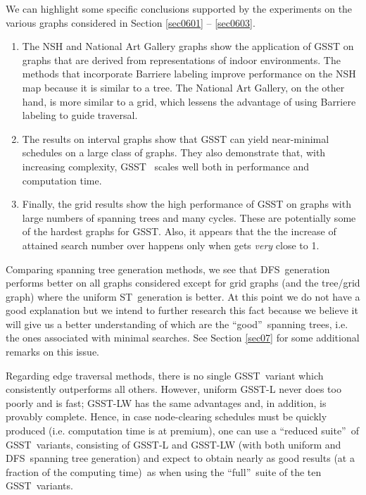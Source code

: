 \documentclass[11pt]{article}\usepackage{amsmath}
\begin{document}
We can highlight some specific conclusions supported by the experiments on the
various graphs considered in Section \ref{sec0601} -- \ref{sec0603}.

\begin{enumerate}
\item The NSH and National Art Gallery graphs show the application of GSST on
graphs that are derived from representations of indoor environments. The
methods that incorporate Barriere labeling improve performance on the NSH map
because it is similar to a tree. The National Art Gallery, on the other hand,
is more similar to a grid, which lessens the advantage of using Barriere
labeling to guide traversal.

\item The results on interval graphs show that GSST can yield near-minimal
schedules on a large class of graphs. They also demonstrate that, with
increasing complexity, GSST \ scales well both in performance and computation time.

\item Finally, the grid results show the high performance of GSST on graphs
with large numbers of spanning trees and many cycles. These are potentially
some of the hardest graphs for GSST. Also, it appears that the the increase of
attained search number over  happens only
when  gets \emph{very} close to 1.
\end{enumerate}

Comparing spanning tree generation methods, we see that DFS\ generation
performs better on all graphs considered except for grid graphs (and the
tree/grid graph) where the uniform ST\ generation is better. At this point we
do not have a good explanation but we intend to further research this fact
because we believe it will give us a better understanding of which are the
\textquotedblleft good\textquotedblright\ spanning trees, i.e. the ones
associated with minimal searches. See Section \ref{sec07} for some additional
remarks on this issue.

Regarding edge traversal methods, there is no single GSST\ variant which
consistently outperforms all others. However, uniform GSST-L never does too
poorly and is fast; GSST-LW has the same advantages and, in addition, is
provably complete. Hence, in case node-clearing schedules must be quickly
produced (i.e. computation time is at premium), one can use a
\textquotedblleft reduced suite\textquotedblright\ of GSST\ variants,
consisting of GSST-L and GSST-LW (with both uniform and DFS\ spanning tree
generation) and expect to obtain nearly as good results (at a fraction of the
computing time)\ as when using the \textquotedblleft full\textquotedblright \ suite of the ten GSST\ variants.
\end{document}
